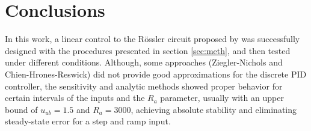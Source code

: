 \section{Conclusions}\label{sec:conc}
In this work, a linear control to the Rössler circuit proposed by \cite{canals2014random} was successfully designed with the procedures presented in section \ref{sec:meth}, and then tested under different conditions. Although, some approaches (Ziegler-Nichols and Chien-Hrones-Reswick) did not provide good approximations for the discrete PID controller, the sensitivity and analytic methods showed proper behavior for certain intervals of the inputs and the $R_a$ parameter, usually with an upper bound of $u_{ub} = 1.5$ and $R_a = 3000$, achieving absolute stability and eliminating steady-state error for a step and ramp input.